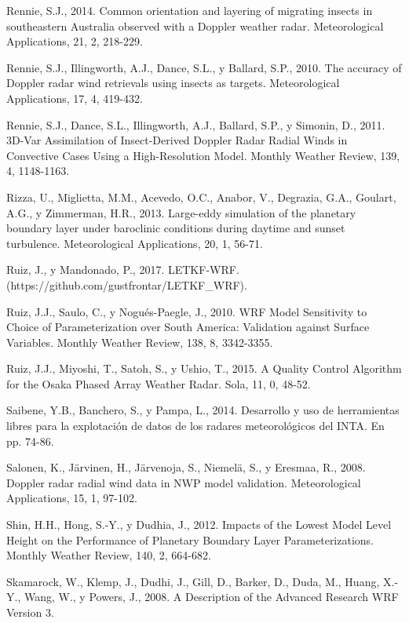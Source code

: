 \documentclass[12pt,spanish,oneside]{book}
\begin{document}
\hypertarget{ref-Rennie2014}{}
Rennie, S.J., 2014. Common orientation and layering of migrating insects
in southeastern Australia observed with a Doppler weather radar.
Meteorological Applications, 21, 2, 218-229.

\hypertarget{ref-Rennie2010}{}
Rennie, S.J., Illingworth, A.J., Dance, S.L., y Ballard, S.P., 2010. The
accuracy of Doppler radar wind retrievals using insects as targets.
Meteorological Applications, 17, 4, 419-432.

\hypertarget{ref-Rennie2011}{}
Rennie, S.J., Dance, S.L., Illingworth, A.J., Ballard, S.P., y Simonin,
D., 2011. 3D-Var Assimilation of Insect-Derived Doppler Radar Radial
Winds in Convective Cases Using a High-Resolution Model. Monthly Weather
Review, 139, 4, 1148-1163.

\hypertarget{ref-Rizza2013}{}
Rizza, U., Miglietta, M.M., Acevedo, O.C., Anabor, V., Degrazia, G.A.,
Goulart, A.G., y Zimmerman, H.R., 2013. Large-eddy simulation of the
planetary boundary layer under baroclinic conditions during daytime and
sunset turbulence. Meteorological Applications, 20, 1, 56-71.

\hypertarget{ref-Ruiz2017}{}
Ruiz, J., y Mandonado, P., 2017. LETKF-WRF.
(https://github.com/gustfrontar/LETKF\_WRF).

\hypertarget{ref-Ruiz2010}{}
Ruiz, J.J., Saulo, C., y Nogués-Paegle, J., 2010. WRF Model Sensitivity
to Choice of Parameterization over South America: Validation against
Surface Variables. Monthly Weather Review, 138, 8, 3342-3355.

\hypertarget{ref-Ruiz2015}{}
Ruiz, J.J., Miyoshi, T., Satoh, S., y Ushio, T., 2015. A Quality Control
Algorithm for the Osaka Phased Array Weather Radar. Sola, 11, 0, 48-52.

\hypertarget{ref-Saibene2014}{}
Saibene, Y.B., Banchero, S., y Pampa, L., 2014. Desarrollo y uso de
herramientas libres para la explotación de datos de los radares
meteorológicos del INTA. En pp. 74-86.

\hypertarget{ref-Salonen2008}{}
Salonen, K., Järvinen, H., Järvenoja, S., Niemelä, S., y Eresmaa, R.,
2008. Doppler radar radial wind data in NWP model validation.
Meteorological Applications, 15, 1, 97-102.

\hypertarget{ref-Shin2012}{}
Shin, H.H., Hong, S.-Y., y Dudhia, J., 2012. Impacts of the Lowest Model
Level Height on the Performance of Planetary Boundary Layer
Parameterizations. Monthly Weather Review, 140, 2, 664-682.

\hypertarget{ref-Skamarock2008}{}
Skamarock, W., Klemp, J., Dudhi, J., Gill, D., Barker, D., Duda, M.,
Huang, X.-Y., Wang, W., y Powers, J., 2008. A Description of the
Advanced Research WRF Version 3.
\end{document}
